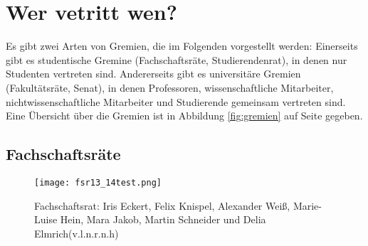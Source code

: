 
\section{Wer vetritt wen?}
\label{vertretung}

Es gibt zwei Arten von Gremien, die im Folgenden vorgestellt werden: Einerseits gibt es studentische Gremine (Fachschaftsräte, Studierendenrat), in denen nur Studenten vertreten sind. Andererseits gibt es universitäre Gremien (Fakultätsräte, Senat), in denen Professoren, wissenschaftliche Mitarbeiter, nichtwissenschaftliche Mitarbeiter und Studierende gemeinsam vertreten sind.
Eine Übersicht über die Gremien ist in Abbildung \ref{fig:gremien} auf Seite \pageref{fig:gremien} gegeben.

\subsection{Fachschaftsräte}

\begin{figure}[!t]
    \centering
    \texttt{[image: fsr13\_14test.png]}
    \caption{Fachschaftsrat:\newline
             Iris Eckert, Felix Knispel, Alexander Weiß, Marie-Luise Hein, Mara Jakob, Martin Schneider und Delia Elmrich\newline (v.l.n.r.n.h)}
             \label{fig:fsr}
\end{figure}

